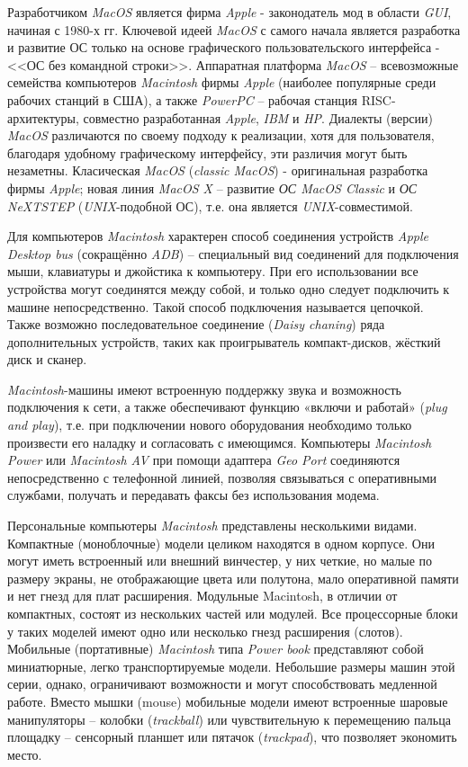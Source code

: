 Разработчиком \textit{MacOS} является фирма \textit{Apple} - законодатель мод в области \textit{GUI}, начиная с 1980-х гг. Ключевой идеей \textit{MacOS} с самого начала является разработка и развитие ОС только на основе графического пользовательского интерфейса - <<ОС без командной строки>>. Аппаратная платформа \textit{MacOS} – всевозможные семейства компьютеров \textit{Macintosh} фирмы \textit{Apple} (наиболее популярные среди рабочих станций в США), а также \textit{PowerPC} – рабочая станция RISC-архитектуры, совместно разработанная \textit{Apple}, \textit{IBM} и \textit{HP}. Диалекты (версии) \textit{MacOS} различаются по своему подходу к реализации, хотя для пользователя, благодаря удобному графическому интерфейсу, эти различия могут быть незаметны. Класическая \textit{MacOS} (\textit{classic MacOS}) - оригинальная разработка фирмы \textit{Apple}; новая линия \textit{MacOS X} – развитие \textit{ОС MacOS Classic} и \textit{ОС NeXTSTEP} (\textit{UNIX}-подобной ОС), т.е. она является \textit{UNIX}-совместимой.

Для компьютеров \textit{Macintosh} характерен способ соединения устройств \textit{Apple Desktop bus} (сокращённо \textit{ADB}) – специальный вид соединений для подключения мыши, клавиатуры и джойстика к компьютеру. При его использовании все устройства могут соединятся между собой, и только одно следует подключить к машине непосредственно. Такой способ подключения называется цепочкой. Также возможно последовательное соединение (\textit{Daisy chaning}) ряда дополнительных устройств, таких как проигрыватель компакт-дисков, жёсткий диск и сканер.

\textit{Macintosh}-машины имеют встроенную поддержку звука и возможность подключения к сети, а также обеспечивают функцию «включи и работай» (\textit{plug and play}), т.е. при подключении нового оборудования необходимо только произвести его наладку и согласовать с имеющимся. Компьютеры \textit{Macintosh Power} или \textit{Macintosh AV} при помощи адаптера \textit{Geo Port} соединяются непосредственно с телефонной линией, позволяя связываться с оперативными службами, получать и передавать факсы без использования модема.

Персональные компьютеры \textit{Macintosh} представлены несколькими видами. Компактные (моноблочные) модели целиком находятся в одном корпусе. Они могут иметь встроенный или внешний винчестер, у них четкие, но малые по размеру экраны, не отображающие цвета или полутона, мало оперативной памяти и нет гнезд для плат расширения. Модульные Macintosh, в отличии от компактных, состоят из нескольких частей или модулей. Все процессорные блоки у таких моделей имеют одно или несколько гнезд расширения (слотов). Мобильные (портативные) \textit{Macintosh} типа \textit{Power book} представляют собой миниатюрные, легко транспортируемые модели. Небольшие размеры машин этой серии, однако, ограничивают возможности и могут способствовать медленной работе. Вместо мышки (mouse) мобильные модели имеют встроенные шаровые манипуляторы – колобки (\textit{trackball}) или чувствительную к перемещению пальца площадку – сенсорный планшет или пятачок (\textit{trackpad}), что позволяет экономить место.

